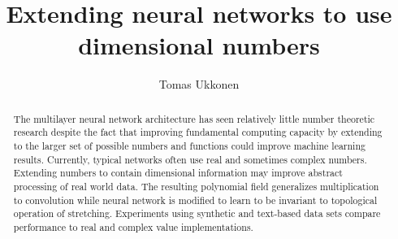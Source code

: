 \documentclass[preprint,12pt]{elsarticle}
\begin{document}
\begin{frontmatter}



\title{Extending neural networks to use dimensional numbers}


\author{Tomas Ukkonen}
\address{Novel Insight, Finland}

\begin{abstract}
  The multilayer neural network architecture has seen relatively little number theoretic research
  despite the fact that improving fundamental computing capacity by extending to
  the larger set of possible 
  numbers and functions could improve machine learning results. Currently, typical networks often use 
  real and sometimes complex numbers. Extending numbers to contain dimensional information 
  may improve abstract processing of real world data. The resulting polynomial field generalizes
  multiplication to convolution while neural network is modified to learn to 
  be invariant to topological operation of stretching. Experiments using synthetic and
  text-based data sets compare performance to real and complex value implementations.

\end{abstract}




\end{frontmatter}
\end{document}
